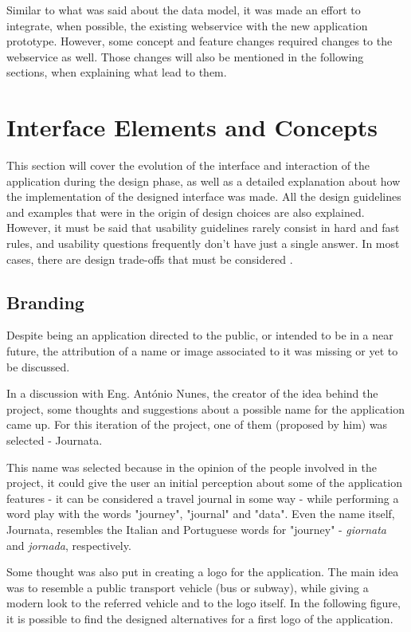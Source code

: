 Similar to what was said about the data model, it was made an effort to integrate, when possible, the existing webservice with the new application prototype. However, some concept and feature changes required changes to the webservice as well. Those changes will also be mentioned in the following sections, when explaining what lead to them.

\clearpage

\section{Interface Elements and Concepts}\label{interfacecon}

This section will cover the evolution of the interface and interaction of the application during the design phase, as well as a detailed explanation about how the implementation of the designed interface was made.
All the design guidelines and examples that were in the origin of design choices are also explained. However, it must be said that usability guidelines rarely consist in hard and fast rules, and usability questions frequently don't have just a single answer. In most cases, there are design trade-offs that must be considered \cite{kn:MobileUsab}.

\subsection{Branding}

Despite being an application directed to the public, or intended to be in a near future, the attribution of a name or image associated to it was missing or yet to be discussed.


In a discussion with Eng. António Nunes, the creator of the idea behind the project, some thoughts and suggestions about a possible name for the application came up. For this iteration of the project, one of them (proposed by him) was selected - Journata.

This name was selected because in the opinion of the people involved in the project, it could give the user an initial perception about some of the application features - it can be considered a travel journal in some way - while performing a word play with the words "journey", "journal" and "data". Even the name itself, Journata, resembles the Italian and Portuguese words for "journey" - \emph{giornata} and \emph{jornada}, respectively.

Some thought was also put in creating a logo for the application. The main idea was to resemble a public transport vehicle (bus or subway), while giving a modern look to the referred vehicle and to the logo itself. In the following figure, it is possible to find the designed alternatives for a first logo of the application. 

